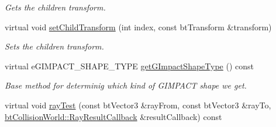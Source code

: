 \begin{CompactItemize}
\begin{CompactList}\small\item\em Gets the children transform. \item\end{CompactList}\item 
virtual void \hyperlink{classbt_g_impact_mesh_shape_274feed3c9a38a6af5c9f1141ae9ac1a}{setChildTransform} (int index, const btTransform \&transform)
\begin{CompactList}\small\item\em Sets the children transform. \item\end{CompactList}\item 
virtual eGIMPACT\_\-SHAPE\_\-TYPE \hyperlink{classbt_g_impact_mesh_shape_cd958461b4f7802e5bceed2db87c4ff0}{getGImpactShapeType} () const 
\begin{CompactList}\small\item\em Base method for determinig which kind of GIMPACT shape we get. \item\end{CompactList}\item 
\hypertarget{classbt_g_impact_mesh_shape_219d87a155aa1cb9af6df7a2413fde47}{
virtual void \hyperlink{classbt_g_impact_mesh_shape_219d87a155aa1cb9af6df7a2413fde47}{rayTest} (const btVector3 \&rayFrom, const btVector3 \&rayTo, \hyperlink{structbt_collision_world_1_1_ray_result_callback}{btCollisionWorld::RayResultCallback} \&resultCallback) const }
\label{classbt_g_impact_mesh_shape_219d87a155aa1cb9af6df7a2413fde47}


\end{CompactItemize}
